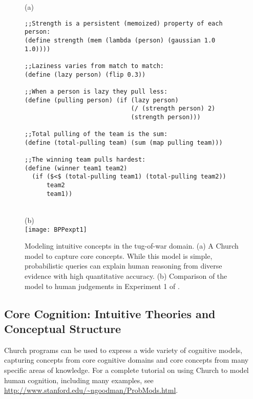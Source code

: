 \documentclass[12pt]{article}
\begin{document}
\begin{figure}[htbp]
\begin{center}

(a)\\
\begin{minipage}[b]{0.7\linewidth}
\begin{lstlisting}[mathescape]
;;Strength is a persistent (memoized) property of each person:
(define strength (mem (lambda (person) (gaussian 1.0 1.0))))

;;Laziness varies from match to match:
(define (lazy person) (flip 0.3))

;;When a person is lazy they pull less:
(define (pulling person) (if (lazy person) 
                             (/ (strength person) 2) 
                             (strength person)))

;;Total pulling of the team is the sum:
(define (total-pulling team) (sum (map pulling team)))
          
;;The winning team pulls hardest:    
(define (winner team1 team2) 
  (if ($<$ (total-pulling team1) (total-pulling team2)) 
      team2 
      team1))
\end{lstlisting}
\end{minipage}\\
(b)\\
\texttt{[image: BPPexpt1]}

\caption{Modeling intuitive concepts in the tug-of-war domain. (a) A Church model to capture core concepts.  While this model is simple, probabilistic queries can explain human reasoning from diverse evidence with high quantitative accuracy. (b) Comparison of the model to human judgements in Experiment 1 of \cite{gerstenberg2012}.}
\label{tug}
\end{center}
\end{figure}



\subsection{Core Cognition: Intuitive Theories and Conceptual Structure}

Church programs can be used to express a wide variety of cognitive models, capturing concepts from core cognitive domains and core concepts from many specific areas of knowledge. For a complete tutorial on using Church to model human cognition, including many  examples, see \url{http://www.stanford.edu/~ngoodman/ProbMods.html}.
\end{document}
